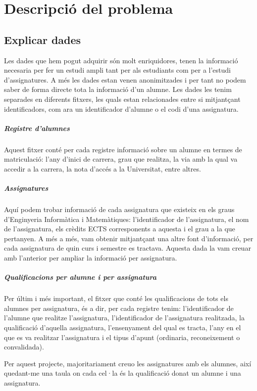\documentclass[12pt,a4paper,catalan]{article}
\begin{document}
\newpage


\section{Descripció del problema}
\subsection{Explicar dades} 
Les dades que hem pogut adquirir són molt enriquidores, tenen la informació necesaria per fer un estudi ampli tant per als estudiants com per a l'estudi d'assignatures. A més les dades estan venen anonimitzades i per tant no podem saber de forma directe tota la informació d'un alumne. Les dades les tenim separades en diferents fitxers, les quals estan relacionades entre si mitjantçant identificadors, com ara un identificador d'alumne o el codi d'una assignatura.

\subparagraph{Registre d'alumnes}
Aquest fitxer conté per cada registre informació sobre un alumne en termes de matriculació: l'any d'inici de carrera, grau que realitza, la via amb la qual va accedir a la carrera, la nota d'accés a la Universitat, entre altres.

\subparagraph{Assignatures}
Aquí podem trobar informació de cada assignatura que existeix en els graus d'Enginyeria Informàtica i Matemàtiques: l'identificador de l'assignatura, el nom de l'assignatura, els crèdits ECTS corresponents a aquesta i el grau a la que pertanyen. A més a més, vam obtenir mitjantçant una altre font d'informació, per cada assignatura de quin curs i semestre es tractava. Aquesta dada la vam creuar amb l'anterior per ampliar la informació per assignatura.

\subparagraph{Qualificacions per alumne i per assignatura}
Per últim i més important, el fitxer que conté les qualificacions de tots els alumnes per assignatura, és a dir, per cada registre tenim: l'identificador de l'alumne que realitze l'assignatura, l'identificador de l'assignatura realitzada, la qualificació d'aquella assignatura, l'ensenyament del qual es tracta, l'any en el que es va realitzar l'assignatura i el tipus d'apunt (ordinaria, reconeixement o convalidada).

Per aquest projecte, majoritariament creuo les assignatures amb els alumnes, així quedant-me una taula on cada cel·la és la qualificació donat un alumne i una assignatura.

\newpage
\end{document}
